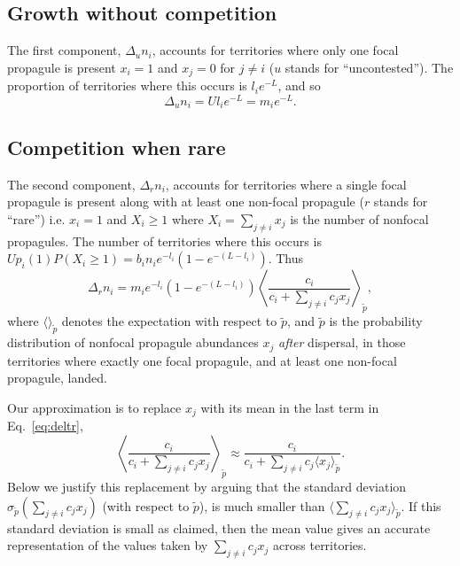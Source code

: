 \documentclass[12pt]{article}
\begin{document}
\subsection*{Growth without competition}

The first component, $\Delta_u n_i$, accounts for territories where only one focal propagule is present $x_i=1$ and $x_j=0$ for $j\neq i$ ($u$ stands for ``uncontested''). The proportion of territories where this occurs is $l_i e^{-L}$, and so 
\begin{equation}
\Delta_u n_i=Ul_i e^{-L}=m_i e^{-L}.
\end{equation}

\subsection*{Competition when rare}

The second component, $\Delta_r n_i$, accounts for territories where a single focal propagule is present along with at least one non-focal propagule ($r$ stands for ``rare'') i.e. $x_i=1$ and $X_i\geq 1$ where $X_i=\sum_{j\neq i} x_j$ is the number of nonfocal propagules. The number of territories where this occurs is $Up_i(1)P(X_i\geq 1)=b_i n_i e^{-l_i}(1-e^{-(L-l_i)})$. Thus 
\begin{equation}
\Delta_r n_i = m_i e^{-l_i}(1-e^{-(L-l_i)})\left\langle  \frac{c_i}{c_i +\sum_{j\neq i} c_j x_j } \right\rangle_{\tilde{p}},  \label{eq:deltr}
\end{equation}
where $\langle \rangle_{\tilde{p}}$ denotes the expectation with respect to $\tilde{p}$, and $\tilde{p}$ is the probability distribution of nonfocal propagule abundances $x_j$ \textit{after} dispersal, in those territories where exactly one focal propagule, and at least one non-focal propagule, landed. 

Our approximation is to replace $x_j$ with its mean in the last term in Eq.~\eqref{eq:deltr},
\begin{equation}
\left\langle\frac{c_i}{c_i +\sum_{j\neq i} c_j x_j}\right\rangle_{\tilde{p}}\approx \frac{c_i}{c_i +\sum_{j\neq i} c_j \langle x_j\rangle_{\tilde{p}}}.\label{eq:meanfieldr}
\end{equation}
Below we justify this replacement by arguing that the standard deviation $\sigma_{\tilde{p}}(\sum_{j\neq i} c_j x_j)$ (with respect to $\tilde{p}$), is much smaller than $\langle\sum_{j\neq i} c_j x_j\rangle_{\tilde{p}}$. If this standard deviation is small as claimed, then the mean value gives an accurate representation of the values taken by $\sum_{j\neq i} c_j x_j$ across territories. 
\end{document}
